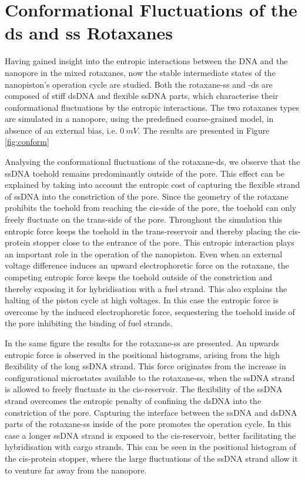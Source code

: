 \section{Conformational Fluctuations of the ds and ss Rotaxanes}

Having gained insight into the entropic interactions between the DNA and the
nanopore in the mixed rotaxanes, now the stable intermediate states of the nanopiston's
operation cycle are
studied. Both the rotaxane-ss and -ds are composed of stiff dsDNA and flexible ssDNA
parts, which characterise their conformational fluctuations by the entropic interactions.
The two rotaxanes types are simulated in a nanopore, using the predefined coarse-grained
model, in absence of an external bias, i.e.  $0\ mV$. The results are presented in Figure
\ref{fig:conform}

Analysing the conformational fluctuations of the rotaxane-ds, we observe that the ssDNA
toehold remains predominantly outside of the pore. This effect can be explained by taking
into account the entropic cost of capturing the flexible strand of ssDNA into the
constriction of the pore. Since the geometry of the rotaxane prohibits the toehold from
reaching the cis-side of the pore, the toehold can only freely fluctuate on the
trans-side of the pore. Throughout the simulation this entropic force keeps the toehold
in the trans-reservoir and thereby placing the cis-protein stopper close to the entrance
of the pore. This entropic interaction plays an important role in the operation of the
nanopiston. Even when an external voltage difference induces an upward electrophoretic
force on the rotaxane, the competing entropic force keeps the toehold outside of the
constriction and thereby exposing it for hybridisation with a fuel strand. This also
explains the halting of the piston cycle at high voltages. In this case the entropic
force is overcome by the induced electrophoretic force, sequestering the toehold inside
of the pore inhibiting the binding of fuel strands.

In the same figure the results for the rotaxane-ss are presented. An upwards entropic
force is observed in the positional histograms, arising from the high flexibility of the
long ssDNA strand. This force originates from the increase in configurational microstates
available to the rotaxane-ss, when the ssDNA strand is allowed to freely fluctuate in the
cis-reservoir. The flexibility of the ssDNA strand overcomes the entropic penalty of
confining the dsDNA into the constriction of the pore. Capturing the interface between
the ssDNA and dsDNA parts of the rotaxane-ss inside of the pore promotes the
operation cycle. In this case a longer ssDNA strand is exposed to the cis-reservoir,
better facilitating the hybridisation with cargo strands. This can be seen in the
positional histogram of the cis-protein stopper, where the large fluctuations of the
ssDNA strand allow it to venture far away from the nanopore.

